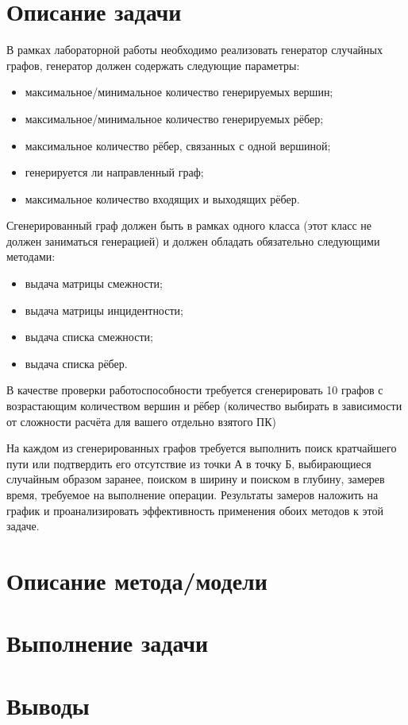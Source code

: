 \documentclass[12pt, a4paper]{report}
\begin{document}
	\section*{Описание задачи}
	\large
	В рамках лабораторной работы необходимо реализовать генератор случайных графов, генератор должен содержать следующие параметры:
	\begin{itemize}
		\item максимальное/минимальное количество генерируемых вершин;
		\item максимальное/минимальное количество генерируемых рёбер;
		\item максимальное количество рёбер, связанных с одной вершиной;
		\item генерируется ли направленный граф;
		\item максимальное количество входящих и выходящих рёбер.
	\end{itemize}
	\par
	Сгенерированный граф должен быть в рамках одного класса (этот класс не должен заниматься генерацией) и должен обладать обязательно следующими методами:
	\begin{itemize}
		\item выдача матрицы смежности;
		\item выдача матрицы инцидентности;
		\item выдача списка смежности;
		\item выдача списка рёбер.
	\end{itemize}
	\par
	В качестве проверки работоспособности требуется сгенерировать 10 графов с возрастающим количеством вершин и рёбер (количество выбирать в зависимости от сложности расчёта для вашего отдельно взятого ПК)
	\par
	На каждом из сгенерированных графов требуется выполнить поиск кратчайшего пути или подтвердить его отсутствие из точки А в точку Б, выбирающиеся случайным образом заранее, поиском в ширину и поиском в глубину, замерев время, требуемое на выполнение операции. Результаты замеров наложить на график и проанализировать эффективность применения обоих методов к этой задаче.
	
	\newpage

	\section*{Описание метода/модели}
	\large

	\newpage

	\section*{Выполнение задачи}

	\newpage
	\vfill

	\begin{figure}

	\end{figure}

	\vfill
	\clearpage

	\section*{Выводы}
\end{document}
